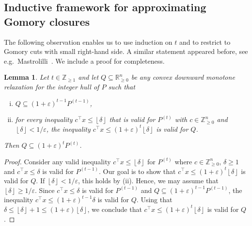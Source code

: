 \documentclass[11pt]{article}
\newcommand{\R}{\mathbb{R}}
\newcommand{\Z}{\mathbb{Z}}
\newcommand{\floor}[1]{\left\lfloor #1 \right\rfloor}
\newcommand{\eps}{\varepsilon}
\newcommand{\numrounds}{t}
\newcommand{\rhs}{\delta}
\newtheorem{lemma}[theorem]{Lemma}
\theoremstyle{remark}
\begin{document}

\subsection{Inductive framework for approximating Gomory closures}

The following observation enables us to use induction on $\numrounds$ and to restrict to Gomory cuts with small right-hand side. A similar statement appeared before, see e.g.~Mastrolilli~\cite{mas20}. We include a proof for completeness.

\begin{lemma} \label{lem:induction}
Let $\numrounds \in \Z_{\ge 1}$ and let $Q \subseteq \R^n_{\ge 0}$ be any convex downward monotone relaxation for the integer hull of $P$ such that 
%
\begin{enumerate}[(i)]
\item $Q \subseteq (1+\eps)^{\numrounds-1} P^{(\numrounds-1)}$,
\item for every inequality $c^\intercal x \le \floor{\delta}$ that is valid for $P^{(\numrounds)}$ with $c \in \Z^n_{\ge 0}$ and $\floor{\delta} < 1/\eps$, the inequality $c^\intercal x \le (1+\eps)^\numrounds \floor{\delta}$ is valid for $Q$. 
\end{enumerate}
%
Then $Q \subseteq (1+\eps)^{\numrounds} P^{(\numrounds)}$.
\end{lemma}

\begin{proof}
Consider any valid inequality $c^\intercal x \le \floor{\delta}$ for $P^{(\numrounds)}$ where $c \in \Z^n_{\ge 0}$, $\delta \ge 1$ and $c^\intercal x \le \delta$ is valid for $P^{(\numrounds-1)}$. Our goal is to show that $c^\intercal x \le (1+\eps)^{\numrounds} \floor{\delta}$ is valid for $Q$. 
%
	If $\floor{\delta} < 1/\eps$, this holds by (ii). Hence, we may assume that $\floor{\delta} \ge 1/\eps$. Since $c^\intercal x \le \delta$ is valid for $P^{(\numrounds-1)}$ and $Q \subseteq (1+\eps)^{\numrounds-1} P^{(\numrounds-1)}$, the inequality $c^\intercal x \le (1+\eps)^{\numrounds-1} \delta$ is valid for $Q$. 
%
Using that $\delta \le \floor{\delta} + 1 \le (1+\eps) \floor{\delta}$, we conclude that $c^\intercal x \le (1+\eps)^{\numrounds} \floor{\delta}$ is valid for $Q$.
\end{proof}

\end{document}
